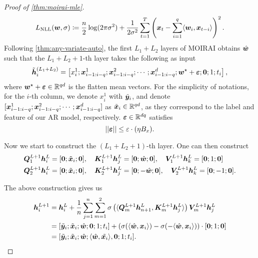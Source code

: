 \begin{proof}[Proof of \cref{thm:moirai-mle}]
    
\[
L_{\text{NLL}}
( \bm{w}, \sigma )
\coloneq
\frac{n}{2}
\log (2 \pi \sigma^2) +
\frac{1}{2\sigma^2}
\sum_{t=1}^T
\left(
\bm{x}_t - \sum_{i=1}^q
\langle \bm{w}_i, \bm{x}_{t-i} \rangle
\right)^2.
\]
Following \cref{thm:any-variate-auto}, the first $L_1 + L_2$ layers of MOIRAI obtains $\hat{\bm{w}}$ such that the $L_1+L_2+1$-th layer takes the following as input
\begin{align*}
    \tilde{\bm{h}}_i^{(L_1+L_2)}
    =    \left[
    x^1_i ; 
    \bm{x}_{i-1:i-q}^1
    ;
    \bm{x}_{i-1:i-q}^2
    ;
    \cdots 
    ;
    \bm{x}_{i-1:i-q}^d
    ; 
    \bm{w}^\star + \bm{\varepsilon}
    ; \bm{0} ; 1; t_i
    \right],
\end{align*}
where $\bm{w}^\star + \bm{\varepsilon} \in \mathbb{R}^{qd}$ is the flatten mean vectors.
For the simplicity of notations, for the $i$-th column, we denote $x^1_i$ with $\tilde{\bm{y}}_i$, and denote $[\bm{x}_{i-1:i-q}^1
    ;
    \bm{x}_{i-1:i-q}^2
    ;
    \cdots 
    ;
    \bm{x}_{i-1:i-q}^d]$ as $\tilde{\bm{x}}_i \in \mathbb{R}^{qd}$, as they correspond to the label and feature of our AR model, respectively.
$\bm{\varepsilon} \in \mathbb{R}^{dq}$ satisfies 
\[
\left\lvert \left\lvert\bm{\varepsilon}\right\rvert \right\rvert
\leq
\varepsilon \cdot (\eta B_x).
\]

Now we start to construct the $(L_1+L_2+1)$-th layer.
One can then construct
\begin{align*}
    \bm{Q}_1^{L+1} \bm{h}^L_i &= [ \bm{0} ; \tilde{\bm{x}}_i ; \bm{0} ], \quad \bm{K}^{L+1}_1 \bm{h}^L_j = [ \bm{0} ; \hat{\bm{w}} ; \bm{0} ], \quad \bm{V}^{L+1}_1 \bm{h}_k^L = [   \bm{0} ; 1 ; \bm{0} ]
    \\
    \bm{Q}_2^{L+1} \bm{h}^L_i &= [ \bm{0} ; \tilde{\bm{x}}_i ; \bm{0} ], \quad \bm{K}^{L+1}_2 \bm{h}^L_j = [ \bm{0} ; -\hat{\bm{w}} ; \bm{0} ], \quad \bm{V}^{L+1}_2 \bm{h}_k^L = [ \bm{0} ; -1 ; \bm{0} ].
\end{align*}

The above construction gives us
\begin{align*}
    \bm{h}_i^{L+1}
    &=
    \bm{h}_i^{L}
    +
    \frac{1}{n}
    \sum_{j=1}^{n}
    \sum_{m=1}^2
    \sigma\left(
    \langle 
    \bm{Q}^{L+1}_m \bm{h}_{n+1}^L,
    \bm{K}_m^{L+1}
    \bm{h}_{j}^L
    \rangle
    \right)
    \bm{V}_m^{L+1}
    \bm{h}_j^L
    \\
    &=
    [ \tilde{\bm{y}}_i ; \tilde{\bm{x}}_i; \hat{\bm{w}} ; \bm{0} ; 1 ; t_i]
    +
    \left(
    \sigma
    (
    \langle \hat{\bm{w}}, \bm{x}_i \rangle
    )
    -
    \sigma 
    (
    -
    \langle \hat{\bm{w}}, \bm{x}_i \rangle
    )
    \right)
    \cdot [ \bm{0} ; 1 ; \bm{0} ]
    \\
    &=
    [ \tilde{\bm{y}}_i ; \tilde{\bm{x}}_i; \hat{\bm{w}} ;  \langle \hat{\bm{w}} , \tilde{\bm{x}_i} \rangle,  \bm{0} ; 1 ; t_i].
\end{align*}


\end{proof}
